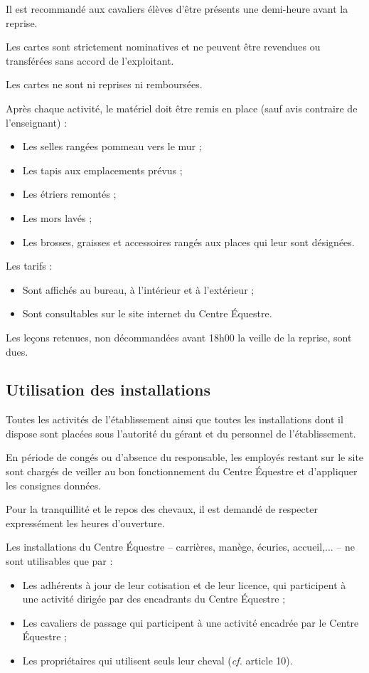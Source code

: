 \documentclass[11pt,a4paper]{article}
\begin{document}
Il est recommandé aux cavaliers élèves d'être présents une demi-heure avant la reprise.

Les cartes sont strictement nominatives et ne peuvent être revendues ou transférées sans accord de l'exploitant. \par
Les cartes ne sont ni reprises ni remboursées.

Après chaque activité, le matériel doit être remis en place (sauf avis contraire de l'enseignant) :
\begin{itemize}[leftmargin=50pt]
\item
Les selles rangées pommeau vers le mur ;
\item
Les tapis aux emplacements prévus ;
\item
Les étriers remontés ;
\item
Les mors lavés ;
\item
Les brosses, graisses et accessoires rangés aux places qui leur sont désignées.
\end{itemize}

Les tarifs :
\begin{itemize}[leftmargin=50pt]
\item
Sont affichés au bureau, à l'intérieur et à l'extérieur ;
\item
Sont consultables sur le site internet du Centre Équestre.
\end{itemize}

Les leçons retenues, non décommandées avant 18h00 la veille de la reprise, sont dues.

\subsection{Utilisation des installations}
Toutes les activités de l'établissement ainsi que toutes les installations dont il dispose sont placées sous l'autorité du gérant et du personnel de l'établissement. \par
En période de congés ou d'absence du responsable, les employés restant sur le site sont chargés de veiller au bon fonctionnement du Centre Équestre et d'appliquer les consignes données. \par
Pour la tranquillité et le repos des chevaux, il est demandé de respecter expressément les heures d'ouverture.

Les installations du Centre Équestre -- carrières, manège, écuries, accueil,... -- ne sont utilisables que par :
\begin{itemize}[leftmargin=50pt]
\item
Les adhérents à jour de leur cotisation et de leur licence, qui participent à une activité dirigée par des encadrants du Centre Équestre ;
\item
Les cavaliers \og de passage \fg{} qui participent à une activité encadrée par le Centre Équestre ;
\item
Les propriétaires qui utilisent seuls leur cheval (\textit{cf.} article 10).
\end{itemize}
\end{document}

